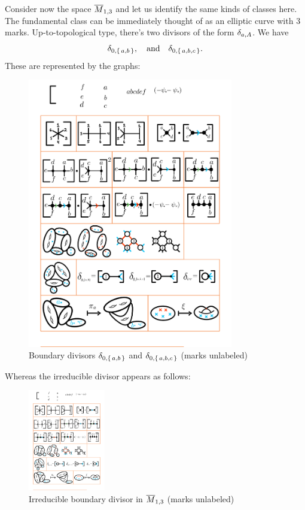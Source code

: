\documentclass[12pt]{memoir}
\begin{document}
\begin{Ex}
    Consider now the space $\overline M_{1,3}$ and let us identify the same kinds of classes here. The fundamental class can be immediately thought of as an elliptic curve with 3 marks. Up-to-topological type, there's two divisors of the form $\delta_{a,A}$. We have 
    $$\delta_{0,\{\,a,b\,\}},\quad\text{and}\quad\delta_{0,\{\,a,b,c\,\}}.$$ 
    These are represented by the graphs:
    \begin{figure}[h!]
        \centering
        \includegraphics[width=0.8\textwidth, trim= 5.12cm 6.5cm 5.7cm 19.8cm,clip]{../figs/FigsDNnotability1.pdf}
        \caption{Boundary divisors $\delta_{0,\{\,a,b\,\}}$ and $\delta_{0,\{\,a,b,c\,\}}$ (marks unlabeled)}
        \label{fig:boundary-divs-M13c1}
    \end{figure}\par
    Whereas the irreducible divisor appears as follows: 
    \begin{figure}[h!]
        \centering
        \includegraphics[width=0.3\textwidth, trim= 16.5cm 6.5cm 1.4cm 19.8cm,clip]{../figs/FigsDNnotability1.pdf}
        \caption{Irreducible boundary divisor in $\overline{M}_{1,3}$ (marks unlabeled)}
        \label{fig:boundary-irr-M13c1}
    \end{figure}
\end{Ex}
\end{document}

